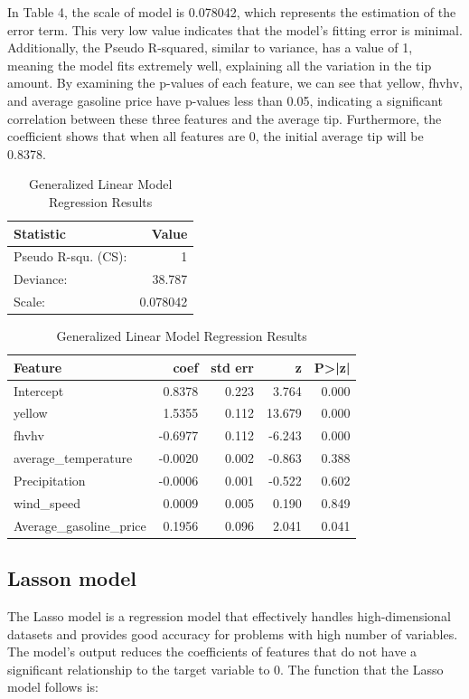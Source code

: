 \documentclass[11pt]{article}
\begin{document}
In Table 4, the scale of model is 0.078042, which represents the estimation of the error term. This very low value indicates that the model's fitting error is minimal. 
Additionally, the Pseudo R-squared, similar to variance, has a value of 1, meaning the model fits extremely well, explaining all the variation in the tip amount. By 
examining the p-values of each feature, we can see that yellow, fhvhv, and average gasoline price have p-values less than 0.05, indicating a significant correlation 
between these three features and the average tip. Furthermore, the coefficient shows that when all features are 0, the initial average tip will be 0.8378.
\begin{table}[ht]
    \centering
    \begin{tabular}{l r} 
    \hline
    \textbf{Statistic} & \textbf{Value} \\
    \hline
    Pseudo R-squ. (CS): & 1 \\
    Deviance: & 38.787 \\
    Scale: & 0.078042 \\
    \hline
    \end{tabular}
    \vspace{0.5cm}  
    \begin{tabular}{l r r r r }
    \hline
    \textbf{Feature} & \textbf{coef} & \textbf{std err} & \textbf{z}  & \textbf{P>|z|}\\
    \hline
    Intercept             & 0.8378 & 0.223 & 3.764 & 0.000  \\
    yellow                & 1.5355 & 0.112 & 13.679 & 0.000 \\
    fhvhv                 & -0.6977 & 0.112 & -6.243 & 0.000  \\
    average\_temperature  & -0.0020 & 0.002 & -0.863 & 0.388  \\
    Precipitation         & -0.0006 & 0.001 & -0.522 & 0.602  \\
    wind\_speed           & 0.0009 & 0.005 & 0.190 & 0.849 \\
    Average\_gasoline\_price & 0.1956 & 0.096 & 2.041 & 0.041  \\
    \hline
    \end{tabular}
    \caption{Generalized Linear Model Regression Results}
    \label{tab:Generalized Linear Model Regression Results}
    \end{table}

\subsection{Lasson model}
The Lasso model is a regression model that effectively handles high-dimensional datasets and provides good accuracy for problems with high number of variables. 
The model's output reduces the coefficients of features that do not have a significant relationship to the target variable to 0. The function that the Lasso model 
follows is:
\end{document}
